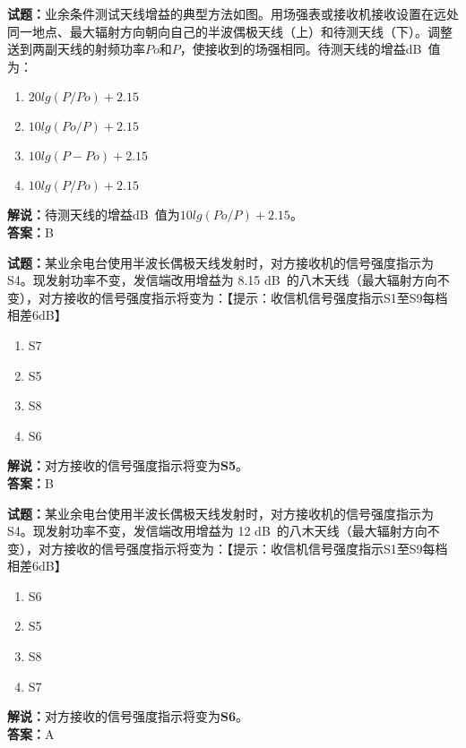 \documentclass{ctexbook}
\begin{document}
\vspace{1em}

\textbf{试题：}业余条件测试天线增益的典型方法如图。用场强表或接收机接收设置在远处同一地点、最大辐射方向朝向自己的半波偶极天线（上）和待测天线（下）。调整送到两副天线的射频功率\(Po\)和\(P\)，使接收到的场强相同。待测天线的增益\unit[qualifier-mode=combine]{\deci\bel{}}值为：
\begin{enumerate}[leftmargin=3em]
  \item \(20 lg(P/Po) + 2.15\)
  \item \(10 lg(Po/P) + 2.15\)
  \item \(10 lg(P-Po) + 2.15\)
  \item \(10 lg(P/Po) + 2.15\)
\end{enumerate}
\noindent\textbf{解说：}待测天线的增益\unit[qualifier-mode=combine]{\deci\bel{}}值为\(10 lg(Po/P) + 2.15\)。\\
\noindent\textbf{答案：}B

\vspace{1em}

\textbf{试题：}某业余电台使用半波长偶极天线发射时，对方接收机的信号强度指示为S4。现发射功率不变，发信端改用增益为 8.15 \unit[qualifier-mode=combine]{\deci\bel{}}的八木天线（最大辐射方向不变），对方接收的信号强度指示将变为：【提示：收信机信号强度指示S1至S9每档相差6dB】
\begin{enumerate}[leftmargin=3em]
  \item S7
  \item S5
  \item S8
  \item S6
\end{enumerate}
\noindent\textbf{解说：}对方接收的信号强度指示将变为\textbf{S5}。\\\noindent\textbf{答案：}B

\vspace{1em}

\textbf{试题：}某业余电台使用半波长偶极天线发射时，对方接收机的信号强度指示为S4。现发射功率不变，发信端改用增益为 12 \unit[qualifier-mode=combine]{\deci\bel{}}的八木天线（最大辐射方向不变），对方接收的信号强度指示将变为：【提示：收信机信号强度指示S1至S9每档相差6dB】
\begin{enumerate}[leftmargin=3em]
  \item S6
  \item S5
  \item S8
  \item S7
\end{enumerate}
\noindent\textbf{解说：}对方接收的信号强度指示将变为\textbf{S6}。\\\noindent\textbf{答案：}A
\end{document}
